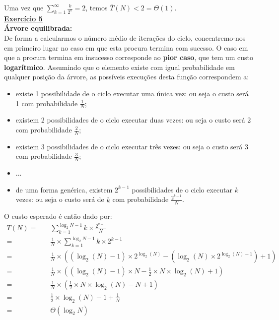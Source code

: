 \documentclass[a4paper,11pt]{article}
\begin{document}
	\noindent Uma vez que $ \sum_{k=1}^{\infty} \frac{k}{2^k} = 2 $, temos $ \overline{T}(N) < 2 = \Theta(1) $.\\
	
	
	\noindent \underline{\textbf{Exercício 5}}\\
	
	\noindent \textbf{Árvore equilibrada:}\\
	
	\noindent De forma a calcularmos o número médio de iterações do ciclo, concentremo-nos em primeiro lugar no caso em que esta procura termina com sucesso. O caso em que a procura termina em insucesso corresponde ao \textbf{pior caso}, que tem um custo \textbf{logarítmico}. Assumindo que o elemento existe com igual probabilidade em qualquer posição da árvore, as possíveis execuções desta função correspondem a:
	
	\begin{itemize}
		\item existe 1 possibilidade de o ciclo executar uma única vez: ou seja o custo será 1 com probabilidade $\frac{1}{N}$;
		\item existem 2 possibilidades de o ciclo executar duas vezes: ou seja o custo será 2 com probabilidade $\frac{2}{N}$;
		\item existem 3 possibilidades de o ciclo executar três vezes: ou seja o custo será 3 com probabilidade $\frac{3}{N}$;
		\item ...
		\item de uma forma genérica, existem $2^{k-1}$ possibilidades de o ciclo executar $k$ vezes: ou seja o custo será de $k$ com probabilidade $\frac{2^{k-1}}{N}$.
	\end{itemize}
	
	\noindent O custo esperado é então dado por:
	\begin{align*}
		\overline{T}(N) = \quad &\sum_{k=1}^{\log_2 N-1} k \times \frac{2^{k-1}}{N}\\
		= \quad &\frac{1}{N} \times \sum_{k=1}^{\log_2 N-1} k \times 2^{k-1}\\
		= \quad &\frac{1}{N} \times ((\log_2(N) - 1) \times 2^{\log_2(N)} - (\log_2(N) \times 2^{\log_2(N)-1}) + 1)\\
		= \quad &\frac{1}{N} \times ((\log_2(N) - 1) \times N - \frac{1}{2} \times N \times \log_2(N) + 1)\\
		= \quad &\frac{1}{N} \times (\frac{1}{2} \times N \times \log_2(N) - N + 1)\\
		= \quad & \frac{1}{2} \times \log_2(N) - 1 + \frac{1}{N}\\
		= \quad &\Theta(\log_2 N)
	\end{align*}
	
\end{document}
